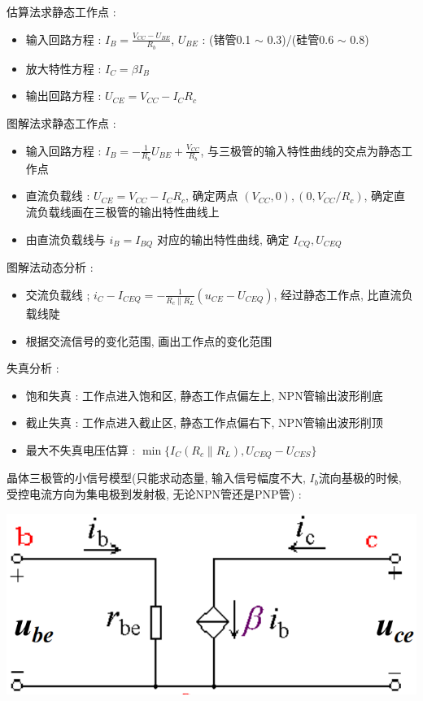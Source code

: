 \documentclass[UTF8, 12pt]{ctexart}
\begin{document}
	估算法求静态工作点 :
	\begin{itemize}[leftmargin = 4em]
		\item 输入回路方程 : $ I_{B} = \frac{V_{CC} - U_{BE}}{R_{b}} $, $ U_{BE} $ : (锗管0.1 $ \sim $ 0.3)/(硅管0.6 $ \sim $ 0.8)
		\item 放大特性方程 : $ I_{C} = \beta I_{B} $
		\item 输出回路方程 : $ U_{CE} = V_{CC} - I_{C}R_{c} $
	\end{itemize}

	图解法求静态工作点 :
	\begin{itemize}[leftmargin = 4em]
		\item 输入回路方程 : $ I_{B} = -\frac{1}{R_{b}}U_{BE} + \frac{V_{CC}}{R_{b}} $, 与三极管的输入特性曲线的交点为静态工作点
		\item 直流负载线 : $ U_{CE} = V_{CC} - I_{C}R_{c} $, 确定两点 $ (V_{CC}, 0), (0, V_{CC} / R_{c}) $, 确定直流负载线画在三极管的输出特性曲线上
		\item 由直流负载线与 $ i_{B} = I_{BQ} $ 对应的输出特性曲线, 确定 $ I_{CQ}, U_{CEQ} $
	\end{itemize}

	图解法动态分析 :
	\begin{itemize}[leftmargin = 4em]
		\item 交流负载线 ; $ i_{C} - I_{CEQ} = -\frac{1}{R_{c} \parallel R_{L}}(u_{CE} - U_{CEQ}) $, 经过静态工作点, 比直流负载线陡
		\item 根据交流信号的变化范围, 画出工作点的变化范围
	\end{itemize}

	失真分析 :
	\begin{itemize}[leftmargin = 4em]
		\item 饱和失真 : 工作点进入饱和区, 静态工作点偏左上, NPN管输出波形削底
		\item 截止失真 : 工作点进入截止区, 静态工作点偏右下, NPN管输出波形削顶
		\item 最大不失真电压估算 : $ \min\{I_{C}(R_{c} \parallel R_{L}), U_{CEQ} - U_{CES}\} $
	\end{itemize}

	晶体三极管的小信号模型(只能求动态量, 输入信号幅度不大, $ I_{b} $流向基极的时候, 受控电流方向为集电极到发射极, 无论NPN管还是PNP管) : 

	\includegraphics[scale = 0.4]{02/晶体三极管的小信号模型.png}
\end{document}
